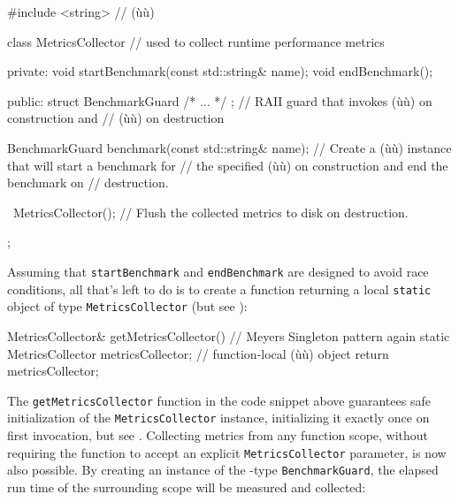 \begin{emcppshiddenlisting}[emcppsbatch=e14]
#include <string>  // (ù{}ù)
\end{emcppshiddenlisting}
\begin{emcppslisting}[emcppsbatch=e14]
class MetricsCollector  // used to collect runtime performance metrics
{
private:
    void startBenchmark(const std::string& name);
    void endBenchmark();

public:
    struct BenchmarkGuard { /* ... */ };
        // RAII guard that invokes (ù{}ù) on construction and
        // (ù{}ù) on destruction

    BenchmarkGuard benchmark(const std::string& name);
        // Create a (ù{}ù) instance that will start a benchmark for
        // the specified (ù{}ù) on construction and end the benchmark on
        // destruction.

    ~MetricsCollector();
        // Flush the collected metrics to disk on destruction.
};
\end{emcppslisting}

\noindent Assuming that \lstinline!startBenchmark! and \lstinline!endBenchmark! are
designed to avoid race conditions, all that's left to do is to create a
function returning a local \lstinline!static! object of type
\lstinline!MetricsCollector! (but see ):

\begin{emcppslisting}[emcppsbatch=e14]
MetricsCollector& getMetricsCollector()  // Meyers Singleton pattern again
{
    static MetricsCollector metricsCollector;  // function-local (ù{}ù) object
    return metricsCollector;
}
\end{emcppslisting}

\noindent The \lstinline!getMetricsCollector! function in the code snippet above
guarantees safe initialization of the \lstinline!MetricsCollector!
instance, initializing it exactly once on first invocation, but see .
Collecting metrics from any function scope, without requiring the
function to accept an explicit \lstinline!MetricsCollector! parameter, is
now also possible. By creating an instance of the -type
\lstinline!BenchmarkGuard!, the elapsed run time of the surrounding scope
will be measured and collected:

